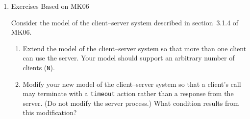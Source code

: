 \documentclass{article}
\begin{document}
\begin{enumerate}
\item Exercises Based on MK06

Consider the model of the client--server system described in section~3.1.4 of MK06.
\begin{enumerate}
\item Extend the model of the client--server system so that more than one client can use the server. Your model should support an arbitrary number of clients (\texttt{N}).

\item Modify your new model of the client--server system so that a client's call may terminate with a \texttt{timeout} action rather than a response from the server. (Do not modify the server process.) What condition results from this modification?
\end{enumerate}
\end{enumerate}
\end{document}
